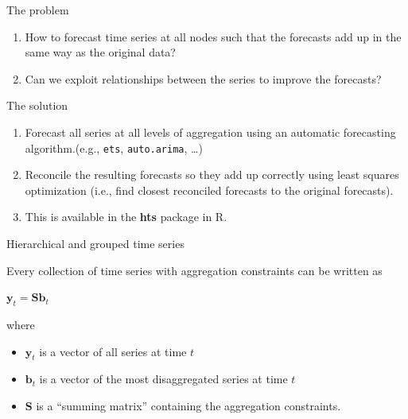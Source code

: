 \documentclass[14pt,ignorenonframetext,]{beamer}
\providecommand{\tightlist}{%
  \setlength{\itemsep}{0pt}\setlength{\parskip}{0pt}}
\def\by{\bm{y}}
\def\bS{\bm{S}}
\begin{document}
\begin{frame}[fragile]{The problem}
\protect\hypertarget{the-problem}{}

\fontsize{13}{14}\sf

\begin{alertblock}{}
\begin{enumerate}\tightlist
 \item How to forecast time series at all nodes such that the forecasts add up in the same way as the original data?
 \item Can we exploit relationships between the series to improve the forecasts?
\end{enumerate}
\end{alertblock}\pause

\begin{block}{The solution}

\begin{enumerate}
\tightlist
\item
  Forecast all series at all levels of aggregation using an automatic
  forecasting algorithm.\newline (e.g., \texttt{ets},
  \texttt{auto.arima}, \ldots{})
\item
  Reconcile the resulting forecasts so they add up correctly using least
  squares optimization (i.e., find closest reconciled forecasts to the
  original forecasts).
\item
  This is available in the \textbf{hts} package in R.
\end{enumerate}

\end{block}

\end{frame}

\begin{frame}{Hierarchical and grouped time series}
\protect\hypertarget{hierarchical-and-grouped-time-series}{}

Every collection of time series with aggregation constraints can be
written as

\begin{block}{}
\centerline{$\by_{t}=\bS\bm{b}_{t}$}
\end{block}

where

\begin{itemize}
\tightlist
\item
  \(\by_t\) is a vector of all series at time \(t\)
\item
  \(\bm{b}_t\) is a vector of the most disaggregated series at time
  \(t\)
\item
  \(\bS\) is a ``summing matrix'' containing the aggregation
  constraints.
\end{itemize}

\end{frame}
\end{document}
